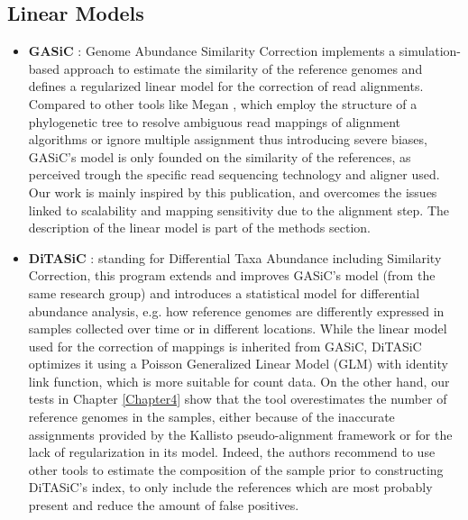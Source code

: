 \subsection{Linear Models}
\begin{itemize}
    \item \textbf{GASiC} \cite{lindner_metagenomic_2013}: Genome Abundance Similarity Correction implements a simulation-based approach to estimate the similarity of the reference genomes and defines a regularized linear model for the correction of read alignments. Compared to other tools like Megan \cite{huson_megan_2007}, which employ the structure of a phylogenetic tree to resolve ambiguous read mappings of alignment algorithms or ignore multiple assignment thus introducing severe biases, GASiC's model is only founded on the similarity of the references, as perceived trough the specific read sequencing technology and aligner used. Our work is mainly inspired by this publication, and overcomes the issues linked to scalability and mapping sensitivity due to the alignment step. The description of the linear model is part of the methods section.
    \item \textbf{DiTASiC} \cite{fischer_abundance_2017}: standing for Differential Taxa Abundance including Similarity Correction, this program extends and improves GASiC's model (from the same research group) and introduces a statistical model for differential abundance analysis, e.g. how reference genomes are differently expressed in samples collected over time or in different locations. While the linear model used for the correction of mappings is inherited from GASiC, DiTASiC optimizes it using a Poisson Generalized Linear Model (GLM) with identity link function, which is more suitable for count data. On the other hand, our tests in Chapter \ref{Chapter4} show that the tool overestimates the number of reference genomes in the samples, either because of the inaccurate assignments provided by the Kallisto pseudo-alignment framework or for the lack of regularization in its model. Indeed, the authors recommend to use other tools to estimate the composition of the sample prior to constructing DiTASiC's index, to only include the references which are most probably present and reduce the amount of false positives.
\end{itemize}
